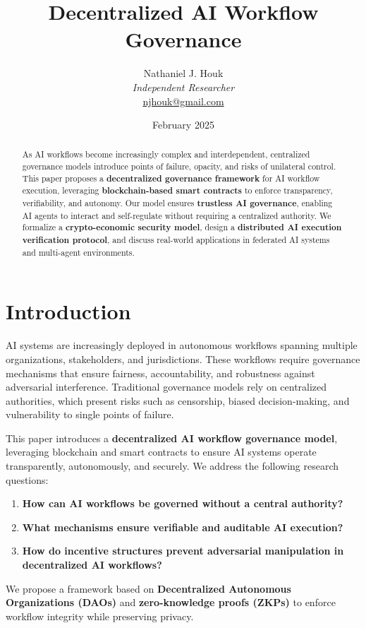 \documentclass{article}
\title{Decentralized AI Workflow Governance}
\author{Nathaniel J. Houk\\
\textit{Independent Researcher}\\
\href{mailto:njhouk@gmail.com}{njhouk@gmail.com}}
\date{February 2025}
\begin{document}
\maketitle

\begin{abstract}
As AI workflows become increasingly complex and interdependent, centralized governance models introduce points of failure, opacity, and risks of unilateral control. This paper proposes a \textbf{decentralized governance framework} for AI workflow execution, leveraging \textbf{blockchain-based smart contracts} to enforce transparency, verifiability, and autonomy. Our model ensures \textbf{trustless AI governance}, enabling AI agents to interact and self-regulate without requiring a centralized authority. We formalize a \textbf{crypto-economic security model}, design a \textbf{distributed AI execution verification protocol}, and discuss real-world applications in federated AI systems and multi-agent environments.
\end{abstract}

\section{Introduction}
AI systems are increasingly deployed in autonomous workflows spanning multiple organizations, stakeholders, and jurisdictions. These workflows require governance mechanisms that ensure fairness, accountability, and robustness against adversarial interference. Traditional governance models rely on centralized authorities, which present risks such as censorship, biased decision-making, and vulnerability to single points of failure.

This paper introduces a \textbf{decentralized AI workflow governance model}, leveraging blockchain and smart contracts to ensure AI systems operate transparently, autonomously, and securely. We address the following research questions:
\begin{enumerate}
    \item \textbf{How can AI workflows be governed without a central authority?}
    \item \textbf{What mechanisms ensure verifiable and auditable AI execution?}
    \item \textbf{How do incentive structures prevent adversarial manipulation in decentralized AI workflows?}
\end{enumerate}

We propose a framework based on \textbf{Decentralized Autonomous Organizations (DAOs)} and \textbf{zero-knowledge proofs (ZKPs)} to enforce workflow integrity while preserving privacy.
\end{document}
